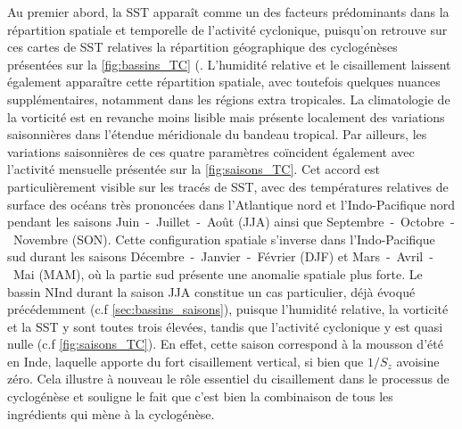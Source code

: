 \documentclass[../main.tex]{subfiles}
\begin{document}
Au premier abord, la SST apparaît comme un des facteurs prédominants dans la répartition spatiale et temporelle de l'activité cyclonique, puisqu'on retrouve sur
ces cartes de SST relatives la répartition géographique des cyclogénèses présentées sur la \cref{fig:bassins_TC} (. L'humidité
relative et le cisaillement laissent également apparaître cette répartition spatiale, avec toutefois quelques nuances supplémentaires, notamment dans les
régions extra tropicales. La climatologie de la vorticité est en revanche moins lisible mais présente localement des variations saisonnières dans l'étendue
méridionale du bandeau tropical. Par ailleurs, les variations saisonnières de ces quatre paramètres coïncident également avec l'activité mensuelle présentée sur
la \cref{fig:saisons_TC}. Cet accord est particulièrement visible sur les tracés de SST, avec des températures relatives de surface des océans très prononcées
dans l'Atlantique nord et l'Indo-Pacifique nord pendant les saisons Juin~-~Juillet~-~Août (JJA) ainsi que
Septembre~-~Octobre~-~Novembre (SON). Cette configuration spatiale s'inverse dans l'Indo-Pacifique sud durant les saisons Décembre~-~Janvier~-~Février (DJF) et
Mars~-~Avril~-~Mai (MAM), où la partie sud présente une anomalie spatiale plus forte. Le bassin NInd durant la saison JJA constitue un cas particulier, déjà
évoqué précédemment (c.f \cref{sec:bassins_saisons}), puisque l'humidité relative, la vorticité et la SST y sont toutes trois élevées, tandis que l'activité
cyclonique y est quasi nulle (c.f \cref{fig:saisons_TC}). En effet, cette saison correspond à la mousson d'été en Inde, laquelle apporte du fort cisaillement
vertical, si bien que $1/S_z$ avoisine zéro. Cela illustre à nouveau le rôle essentiel du cisaillement dans le processus de cyclogénèse et
souligne le fait que c'est bien la combinaison de tous les ingrédients qui mène à la cyclogénèse.
\end{document}

